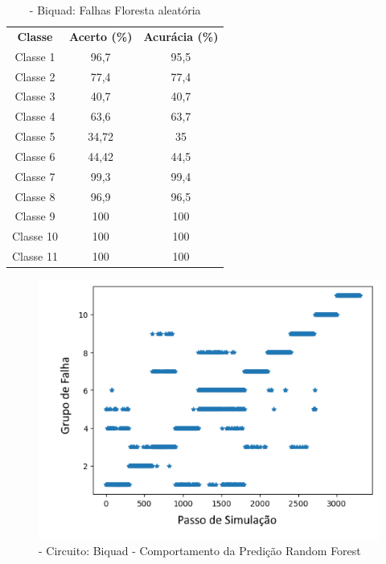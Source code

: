 \begin{itemize}
 \begin{table}[ht]
\centering
\begin{tabular}{ccc}
\textbf{Classe} & \textbf{Acerto (\%)} & \textbf{Acurácia (\%)} \\
Classe 1        & 96,7                 & 95,5                   \\
Classe 2        & 77,4                  & 77,4                    \\
Classe 3        & 40,7                  & 40,7                    \\
Classe 4        & 63,6                  & 63,7                    \\
Classe 5        & 34,72                  & 35                    \\
Classe 6        & 44,42                  & 44,5                   \\
Classe 7        & 99,3                  & 99,4                      \\
Classe 8        & 96,9                  & 96,5                 \\
Classe 9        & 100                  & 100                    \\
Classe 10       & 100                  & 100                    \\
Classe 11       & 100                  & 100                                  
\end{tabular}
\caption{\label{tab:Biqnrandom}- Biquad: Falhas Floresta aleatória}
\end{table}


  \begin{figure}[H]
        \begin{center}
        \includegraphics[width=13cm]{./01_Pre_textuais/biquad_figs/RandomForestClassifier_Biquad_Highpass_Filter_mc_+_4bitPRBS_[FALHA]raw.png}
        \caption{\label{fig:randomforestClassifieBiq}- Circuito: Biquad - Comportamento da Predição Random Forest }
        \end{center}
        \end{figure}


\end{itemize}
